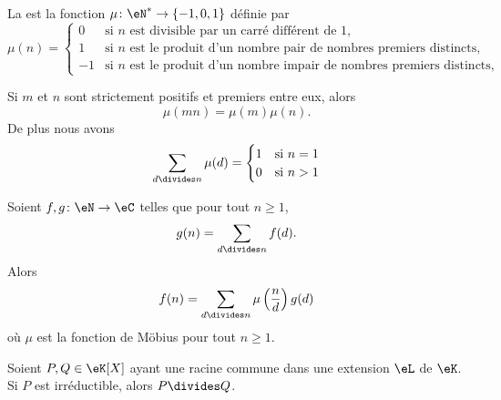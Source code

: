 \begin{definition}  \label{DefWXBkOxg}
	La  est la fonction \( \mu\colon \eN^*\to \{ -1,0,1 \}\) définie par
	\begin{equation}
		\mu(n)=\begin{cases}
			0  & \text{si } n\text{ est divisible par un carré différent de } 1\text{,}               \\
			1  & \text{si } n\text{ est le produit d'un nombre pair de nombres premiers distincts,}   \\
			-1 & \text{si } n\text{ est le produit d'un nombre impair de nombres premiers distincts,}
		\end{cases}
	\end{equation}
\end{definition}

\begin{proposition}     \label{PROPooOVYJooFvmxyj}
	Si \( m\) et \( n\) sont strictement positifs et premiers entre eux, alors
	\begin{equation}
		\mu(mn)=\mu(m)\mu(n).
	\end{equation}
	De plus nous avons
	\begin{equation}
		\sum_{d\divides n}\mu(d)=\begin{cases}
			1 & \text{si } n=1 \\
			0 & \text{si } n>1
		\end{cases}
	\end{equation}
\end{proposition}

\begin{proposition}    \label{PropLBZoIoO}
	Soient \( f,g\colon \eN\to \eC\) telles que pour tout \( n\geq 1\),
	\begin{equation}
		g(n)=\sum_{d\divides n}f(d).
	\end{equation}
	Alors
	\begin{equation}
		f(n)=\sum_{d\divides n}\mu\left( \frac{ n }{ d } \right)g(d)
	\end{equation}
	où \( \mu\) est la fonction de Möbius pour tout \( n\geq 1\).
\end{proposition}

\begin{lemma}   \label{LemRGuWqNu}
	Soient \( P,Q\in \eK[X]\) ayant une racine commune dans une extension \( \eL\) de \( \eK\). Si \( P\) est irréductible, alors \( P\divides Q\).
\end{lemma}

